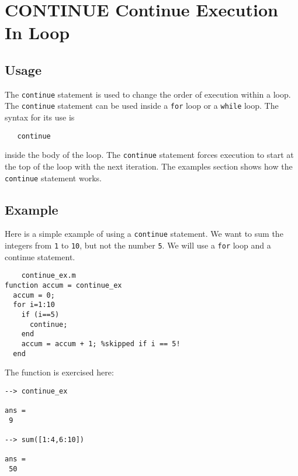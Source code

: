 \section{CONTINUE Continue Execution In Loop}

\subsection{Usage}

The \verb|continue| statement is used to change the order of
execution within a loop.  The \verb|continue| statement can
be used inside a \verb|for| loop or a \verb|while| loop.  The
syntax for its use is 
\begin{verbatim}
   continue
\end{verbatim}
inside the body of the loop.  The \verb|continue| statement
forces execution to start at the top of the loop with
the next iteration.  The examples section shows how
the \verb|continue| statement works.
\subsection{Example}

Here is a simple example of using a \verb|continue| statement.
We want to sum the integers from \verb|1| to \verb|10|, but not
the number \verb|5|.  We will use a \verb|for| loop and a continue
statement.
\begin{verbatim}
    continue_ex.m
function accum = continue_ex
  accum = 0;
  for i=1:10
    if (i==5)
      continue;
    end
    accum = accum + 1; %skipped if i == 5!
  end
\end{verbatim}
The function is exercised here:
\begin{verbatim}
--> continue_ex

ans = 
 9 

--> sum([1:4,6:10])

ans = 
 50 
\end{verbatim}
